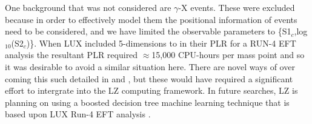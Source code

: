 \par
One background that was not considered are $\gamma$-X events.
These were excluded because in order to effectively model them the positional information of events need to be considered, and we have limited the observable parameters to \{S1$_c$,log$_{10}$(S2$_c$)\}. 
When LUX included 5-dimensions to in their PLR for a RUN-4 EFT analysis the resultant PLR required $\approx$15,000 CPU-hours per mass point \cite{billyboxer_thesis_ref} and so it was desirable to avoid a similar situation here.
There are novel ways of over coming this such detailed in \cite{flamenest_ref} and \cite{lux_ml_plr_ref}, but these would have required a significant effort to intergrate into the LZ computing framework.
In future searches, LZ is planning on using a boosted decision tree machine learning technique that is based upon LUX Run-4 EFT analysis \cite{LUX_RUN4_EFT_2021}.





